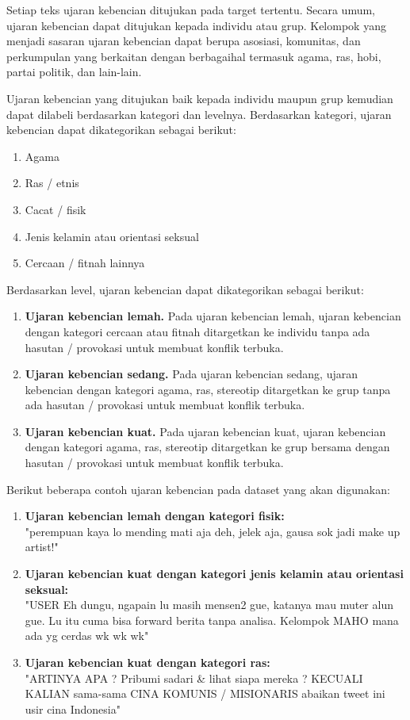 	Setiap teks ujaran kebencian ditujukan pada target tertentu. Secara umum, ujaran kebencian dapat ditujukan kepada individu atau grup. Kelompok yang menjadi sasaran ujaran kebencian dapat berupa asosiasi, komunitas, dan perkumpulan yang berkaitan dengan berbagaihal termasuk agama, ras, hobi, partai politik, dan lain-lain.

	Ujaran kebencian yang ditujukan baik kepada individu maupun grup kemudian dapat dilabeli berdasarkan kategori dan levelnya. Berdasarkan kategori, ujaran kebencian dapat dikategorikan sebagai berikut:
	\begin{enumerate}
		\item Agama
		\item Ras / etnis
		\item Cacat / fisik
		\item Jenis kelamin atau orientasi seksual
		\item Cercaan / fitnah lainnya
	\end{enumerate}

	Berdasarkan level, ujaran kebencian dapat dikategorikan sebagai berikut:
	\begin{enumerate}
		\item \textbf{Ujaran kebencian lemah.} Pada ujaran kebencian lemah, ujaran kebencian dengan kategori cercaan atau fitnah ditargetkan ke individu tanpa ada hasutan / provokasi untuk membuat konflik terbuka.
		\item \textbf{Ujaran kebencian sedang.} Pada ujaran kebencian sedang, ujaran kebencian dengan kategori agama, ras, stereotip ditargetkan ke grup tanpa ada hasutan / provokasi untuk membuat konflik terbuka.
		\item \textbf{Ujaran kebencian kuat.} Pada ujaran kebencian kuat, ujaran kebencian dengan kategori agama, ras, stereotip ditargetkan ke grup bersama dengan hasutan / provokasi untuk membuat konflik terbuka.
	\end{enumerate}

	Berikut beberapa contoh ujaran kebencian pada dataset yang akan digunakan:
	
	\begin{enumerate}
		\item \textbf{Ujaran kebencian lemah dengan kategori fisik:} \\ 
		"perempuan kaya lo mending mati aja deh, jelek aja, gausa sok jadi make up artist!"

		\item \textbf{Ujaran kebencian kuat dengan kategori jenis kelamin atau orientasi seksual:} \\
		"USER Eh dungu, ngapain lu masih mensen2 gue, katanya mau muter alun gue. Lu itu cuma bisa forward berita tanpa analisa. Kelompok MAHO mana ada yg cerdas wk wk wk"

		\item \textbf{Ujaran kebencian kuat dengan kategori ras:} \\ 
		"ARTINYA APA ? Pribumi sadari \& lihat siapa mereka ? KECUALI KALIAN sama-sama CINA KOMUNIS / MISIONARIS abaikan tweet ini usir cina Indonesia"
	\end{enumerate}

